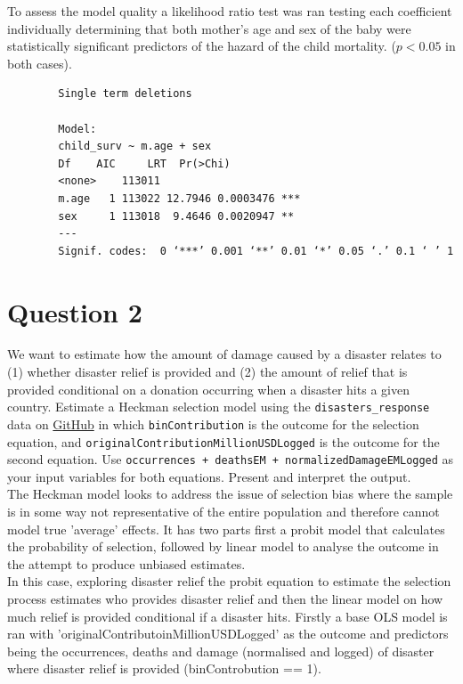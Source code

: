 \documentclass[12pt,letterpaper]{article}
\begin{document}
	To assess the model quality a likelihood ratio test was ran testing each coefficient individually determining that both mother's age and sex of the baby were statistically significant predictors of the hazard of the child mortality. ($p<0.05$ in both cases). 
	
	 
	\begin{Verbatim}
		Single term deletions
		
		Model:
		child_surv ~ m.age + sex
		Df    AIC     LRT  Pr(>Chi)    
		<none>    113011                      
		m.age   1 113022 12.7946 0.0003476 ***
		sex     1 113018  9.4646 0.0020947 ** 
		---
		Signif. codes:  0 ‘***’ 0.001 ‘**’ 0.01 ‘*’ 0.05 ‘.’ 0.1 ‘ ’ 1
	\end{Verbatim}
\section*{Question 2}
\vspace{.25cm}
\noindent We want to estimate how the amount of damage caused by a disaster relates to (1) whether disaster relief is provided and (2) the amount of relief that is provided  conditional on a donation occurring when a disaster hits a given country. Estimate a Heckman selection model using the \texttt{disasters\_response} data on \href{https://raw.githubusercontent.com/ASDS-TCD/StatsII_2026/refs/heads/main/datasets/disaster_response.csv}{GitHub} in which \texttt{binContribution} is the outcome for the selection equation, and \texttt{originalContributionMillionUSDLogged} is the outcome for the second equation. Use \texttt{occurrences  + deathsEM + normalizedDamageEMLogged} as your input variables for both equations. Present and interpret the output. \\


 The Heckman model looks to address the issue of selection bias where the sample is in some way not representative of the entire population and therefore cannot model true 'average' effects. It has two parts first a probit model that calculates the probability of selection, followed by linear model to analyse the outcome in the attempt to produce unbiased estimates. \\
 
 
 In this case, exploring disaster relief the probit equation to estimate the selection process estimates who provides disaster relief and then the linear model on how much relief is provided conditional if a disaster hits.  Firstly a base OLS model is ran with 'originalContributoinMillionUSDLogged' as the outcome and predictors being the occurrences, deaths and damage  (normalised and logged) of disaster where disaster relief is provided (binControbution == 1).  
\end{document}
